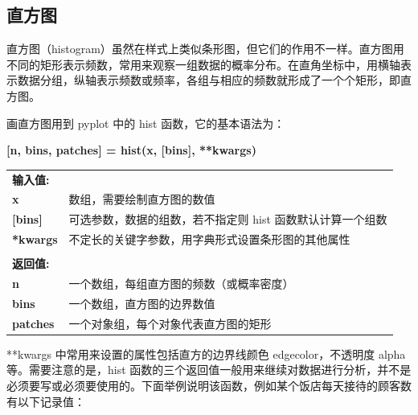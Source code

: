 \clearpage
\subsection{直方图}

直方图（histogram）虽然在样式上类似条形图，但它们的作用不一样。直方图用不同的矩形表示频数，常用来观察一组数据的概率分布。在直角坐标中，用横轴表示数据分组，纵轴表示频数或频率，各组与相应的频数就形成了一个个矩形，即直方图。

画直方图用到 pyplot 中的 hist 函数，它的基本语法为：

\begin{center}
\begin{tcolorbox}[title = hist 函数的语法]
\textbf{[n, bins, patches] = hist(x, [bins], **kwargs)}
\tcblower
\vspace{5pt}

\begin{tcboutputlisting}
\begin{tabular}{>{\bfseries}ll}
  \textbf{输入值:}&\\
    x &数组，需要绘制直方图的数值\\

  [bins] &可选参数，数据的组数，若不指定则 hist 函数默认计算一个组数\\

**kwargs &不定长的关键字参数，用字典形式设置条形图的其他属性\\
&\\
  \textbf{返回值:} &\\
n &一个数组，每组直方图的频数（或概率密度）\\
bins &一个数组，直方图的边界数值\\
patches & 一个对象组，每个对象代表直方图的矩形

\end{tabular}

\tcblower

\end{tcboutputlisting}
\tcbuselistingtext
\end{tcolorbox}
\end{center}

**kwargs 中常用来设置的属性包括直方的边界线颜色 edgecolor，不透明度 alpha 等。需要注意的是，hist 函数的三个返回值一般用来继续对数据进行分析，并不是必须要写或必须要使用的。下面举例说明该函数，例如某个饭店每天接待的顾客数有以下记录值：

